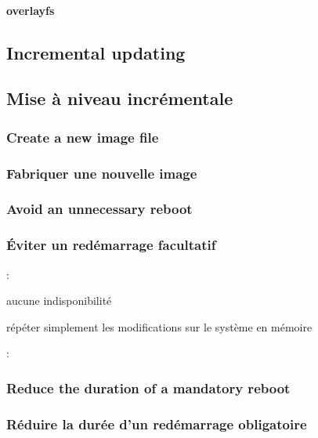 \paragraph{overlayfs}

\ml
{\subsection{Incremental updating}}
{\subsection{Mise à niveau incrémentale}}

\ml
{\subsubsection{Create a new image file}}
{\subsubsection{Fabriquer une nouvelle image}}

\ml
{\subsubsection{Avoid an unnecessary reboot}}
{\subsubsection{Éviter un redémarrage facultatif}}

:
\begin{itmz}
\item{
{aucune indisponibilité}}
\item{
{répéter simplement les modifications sur le système en mémoire}}
\end{itmz}

:
\begin{itmz}
\item{\ml{\todo}
{\todo}}
\end{itmz}

\ml
{\subsubsection{Reduce the duration of a mandatory reboot}}
{\subsubsection{Réduire la durée d’un redémarrage obligatoire}}

